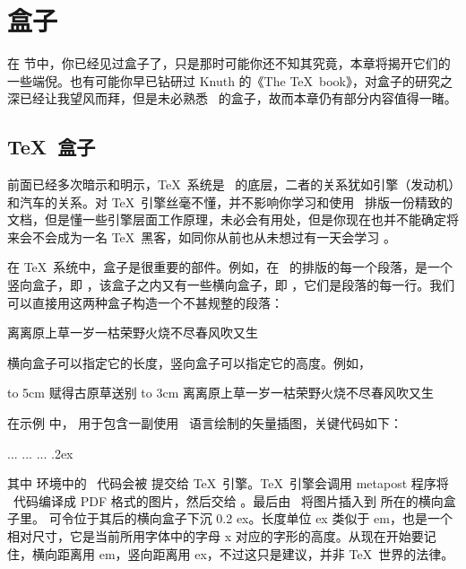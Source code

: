 \chapter{盒子}

在  节中，你已经见过盒子了，只是那时可能你还不知其究竟，本章将揭开它们的一些端倪。也有可能你早已钻研过 Knuth 的《The \TeX\ book》，对盒子的研究之深已经让我望风而拜，但是未必熟悉 \ConTeXt\ 的盒子，故而本章仍有部分内容值得一睹。

\section{\TeX\ 盒子}

前面已经多次暗示和明示，\TeX\ 系统是 \ConTeXt\ 的底层，二者的关系犹如引擎（发动机）和汽车的关系。对 \TeX\ 引擎丝毫不懂，并不影响你学习和使用 \ConTeXt\ 排版一份精致的文档，但是懂一些引擎层面工作原理，未必会有用处，但是你现在也并不能确定将来会不会成为一名 \TeX\ 黑客，如同你从前也从未想过有一天会学习 \ConTeXt。

在 \TeX\ 系统中，盒子是很重要的部件。例如，在 \ConTeXt\ 的排版的每一个段落，是一个竖向盒子，即 \type{\vbox}，该盒子之内又有一些横向盒子，即 \type{\hbox}，它们是段落的每一行。我们可以直接用这两种盒子构造一个不甚规整的段落：

\startsamplecode\startnarrowtyping
\vbox{
  \hbox{离离原上草}\hbox{一岁一枯荣}\hbox{野火烧不尽}\hbox{春风吹又生}
}
\stopnarrowtyping\stopsamplecode
{}

横向盒子可以指定它的长度，竖向盒子可以指定它的高度。例如，

\starttyping[option=TEX]
\hbox to 5cm {赋得古原草送别}
\vbox to 3cm {
  \hbox{离离原上草}\hbox{一岁一枯荣}\hbox{野火烧不尽}\hbox{春风吹又生}
}
\stoptyping

在示例 \in[rsquare] 中，\type{\hbox} 用于包含一副使用 \METAPOST\ 语言绘制的矢量插图，关键代码如下：

\starttyping[option=TEX]
... ... ...
\stopuseMPgraphic
\lower.2ex\hbox{}
\stoptyping

\noindent 其中  环境中的 \METAPOST\ 代码会被  提交给 \TeX\ 引擎。\TeX\ 引擎会调用 metapost 程序将 \METAPOST\ 代码编译成 PDF 格式的图片，然后交给 \ConTeXt。最后由 \ConTeXt\ 将图片插入到  所在的横向盒子里。\type{\lower .2ex} 可令位于其后的横向盒子下沉 0.2 ex。长度单位 ex 类似于 em，也是一个相对尺寸，它是当前所用字体中的字母 x 对应的字形的高度。从现在开始要记住，横向距离用 em，竖向距离用 ex，不过这只是建议，并非 \TeX\ 世界的法律。

